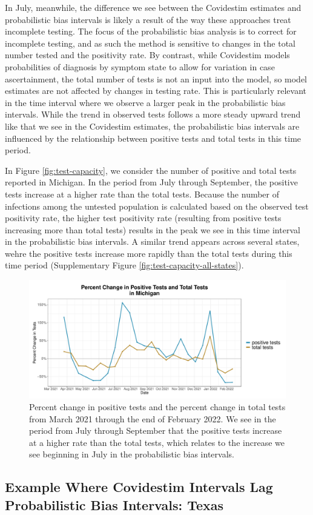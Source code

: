 \documentclass[12pt,twoside]{smiththesis}
\begin{document}
In July, meanwhile, the difference we see between the Covidestim estimates and probabilistic bias intervals is likely a result of the way these approaches treat incomplete testing. The focus of the probabilistic bias analysis is to correct for incomplete testing, and as such the method is sensitive to changes in the total number tested and the positivity rate. By contrast, while Covidestim models probabilities of diagnosis by symptom state to allow for variation in case ascertainment, the total number of tests is not an input into the model, so model estimates are not affected by changes in testing rate. This is particularly relevant in the time interval where we observe a larger peak in the probabilistic bias intervals. While the trend in observed tests follows a more steady upward trend like that we see in the Covidestim estimates, the probabilistic bias intervals are influenced by the relationship between positive tests and total tests in this time period.

In Figure \ref{fig:test-capacity}, we consider the number of positive and total tests reported in Michigan. In the period from July through September, the positive tests increase at a higher rate than the total tests. Because the number of infections among the untested population is calculated based on the observed test positivity rate, the higher test positivity rate (resulting from positive tests increasing more than total tests) results in the peak we see in this time interval in the probabilistic bias intervals. A similar trend appears across several states, wehre the positive tests increase more rapidly than the total tests during this time period (Supplementary Figure \ref{fig:test-capacity-all-states}).
\begin{figure}
\includegraphics[width=1\linewidth]{figure/test_capacity} \caption{\label{fig:test-capacity} Percent change in positive tests and the percent change in total tests from March 2021 through the end of February 2022. We see in the period from July through September that the positive tests increase at a higher rate than the total tests, which relates to the increase we see beginning in July in the probabilistic bias intervals.}\label{fig:unnamed-chunk-8}
\end{figure}
\hypertarget{example-where-covidestim-intervals-lag-probabilistic-bias-intervals-texas}{%
\subsection{Example Where Covidestim Intervals Lag Probabilistic Bias Intervals: Texas}\label{example-where-covidestim-intervals-lag-probabilistic-bias-intervals-texas}}
\end{document}

